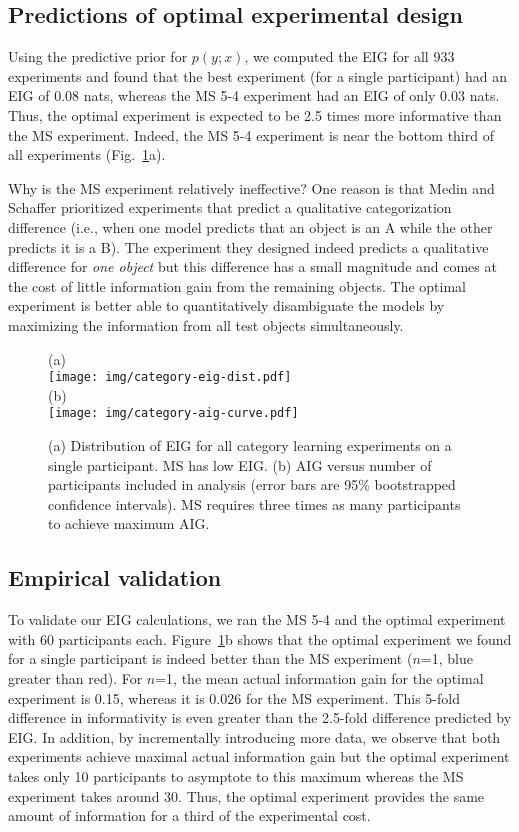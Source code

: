 \documentclass[10pt,letterpaper]{article}
\begin{document}
\subsection{Predictions of optimal experimental design}

Using the predictive prior for $p(y; x)$, we computed the EIG for all 933 experiments and found that the best experiment (for a single participant) had an EIG of 0.08 nats, whereas the MS 5-4 experiment had an EIG of only 0.03 nats.
Thus, the optimal experiment is expected to be 2.5 times more informative than the MS experiment.
Indeed, the MS 5-4 experiment is near the bottom third of all experiments (Fig.~\ref{fig:dist}a).

Why is the MS experiment relatively ineffective?
One reason is that Medin and Schaffer prioritized experiments that predict a qualitative categorization difference (i.e., when one model predicts that an object is an A while the other predicts it is a B).
The experiment they designed indeed predicts a qualitative difference for \emph{one object} but this difference has a small magnitude and comes at the cost of little information gain from the remaining objects.
The optimal experiment is better able to quantitatively disambiguate the models by maximizing the information from all test objects simultaneously.

\begin{figure}[t]
(a) \\
\texttt{[image: img/category-eig-dist.pdf]}\\
(b) \\
\texttt{[image: img/category-aig-curve.pdf]}
\caption{(a) Distribution of EIG for all category learning experiments on a single participant. MS has low EIG. (b) AIG versus number of participants included in analysis (error bars are 95\% bootstrapped confidence intervals). MS requires three times as many participants to achieve maximum AIG.}
\label{fig:dist}
\end{figure}

\subsection{Empirical validation}

To validate our EIG calculations, we ran the MS 5-4 and the optimal experiment with 60 participants each.
Figure~\ref{fig:dist}b shows that the optimal experiment we found for a single participant is indeed better than the MS experiment ($n$=1, blue greater than red).
For $n$=1, the mean actual information gain for the optimal experiment is 0.15, whereas it is 0.026 for the MS experiment.
This 5-fold difference in informativity is even greater than the 2.5-fold difference predicted by EIG.
In addition, by incrementally introducing more data, we observe that both experiments achieve maximal actual information gain but the optimal experiment takes only 10 participants to asymptote to this maximum whereas the MS experiment takes around 30.
Thus, the optimal experiment provides the same amount of information for a third of the experimental cost.
\end{document}
